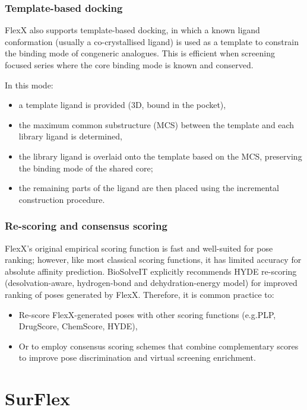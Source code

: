 \documentclass[12pt]{article}
\begin{document}
\subsubsection{Template-based docking}
FlexX also supports template-based docking, in which a known ligand conformation (usually a co-crystallised ligand) is used as a template to constrain the binding mode of congeneric analogues. This is efficient when screening focused series where the core binding mode is known and conserved.

In this mode:
\begin{itemize}
  \item a template ligand is provided (3D, bound in the pocket),
  \item the maximum common substructure (MCS) between the template and each library ligand is determined,
  \item the library ligand is overlaid onto the template based on the MCS, preserving the binding mode of the shared core;
  \item the remaining parts of the ligand are then placed using the incremental construction procedure.
\end{itemize}


\subsubsection{Re-scoring and consensus scoring}

FlexX's original empirical scoring function is fast and well-suited for pose ranking; however, like most classical scoring functions, it has limited accuracy for absolute affinity prediction\cite{CH7_stahl}. BioSolveIT explicitly recommends HYDE re-scoring (desolvation-aware, hydrogen-bond and dehydration-energy model) for improved ranking of poses generated by FlexX.
Therefore, it is common practice to:
\begin{itemize}
  \item Re-score FlexX-generated poses with other scoring functions (e.g.PLP, DrugScore, ChemScore, HYDE),
  \item  Or to employ consensus scoring schemes that combine complementary scores to improve pose discrimination and virtual screening enrichment.
\end{itemize}


\section{SurFlex}
\end{document}
